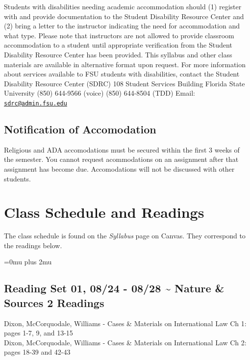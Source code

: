 \documentclass[10pt,]{article}
\begin{document}
Students with disabilities needing academic accommodation should (1)
register with and provide documentation to the Student Disability
Resource Center and (2) bring a letter to the instructor indicating the
need for accommodation and what type. Please note that instructors are
not allowed to provide classroom accommodation to a student until
appropriate verification from the Student Disability Resource Center has
been provided. This syllabus and other class materials are available in
alternative format upon request. For more information about services
available to FSU students with disabilities, contact the Student
Disability Resource Center (SDRC) 108 Student Services Building
\textbar{} Florida State University \textbar{} (850) 644-9566 (voice)
\textbar{} (850) 644-8504 (TDD) \textbar{} Email:
\href{mailto:sdrc@admin.fsu.edu}{\nolinkurl{sdrc@admin.fsu.edu}}

\hypertarget{notification-of-accomodation}{%
\subsection{Notification of
Accomodation}\label{notification-of-accomodation}}

Religious and ADA accomodations must be secured within the first 3 weeks
of the semester. You cannot request acommodations on an assignment after
that assignment has become due. Accomodations will not be discussed with
other students.

\newpage

\hypertarget{class-schedule-and-readings}{%
\section{Class Schedule and
Readings}\label{class-schedule-and-readings}}

The class schedule is found on the \emph{Syllabus} page on Canvas. They
correspond to the readings below.

\Urlmuskip=0mu plus 2mu

\hypertarget{reading-set-01-0824---0828-nature-sources-2-readings}{%
\subsection{Reading Set 01, 08/24 - 08/28 \textasciitilde{} Nature \&
Sources \textbar{} 2
Readings}\label{reading-set-01-0824---0828-nature-sources-2-readings}}

Dixon, McCorquodale, Williams - Cases \& Materials on International Law
\textbar{} Ch 1: pages 1-7, 9, and 13-15\\
Dixon, McCorquodale, Williams - Cases \& Materials on International Law
\textbar{} Ch 2: pages 18-39 and 42-43
\end{document}

